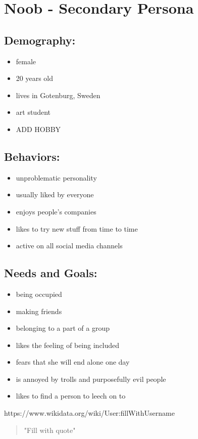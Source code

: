 \documentclass{article}
\date{02.12.2015}
\begin{document}
\section{Noob - Secondary Persona}

\subsection{Demography:}
\begin{itemize}
 \item female
 \item 20 years old
 \item lives in Gotenburg, Sweden
 \item art student
 \item ADD HOBBY
\end{itemize}

\subsection{Behaviors:}
\begin{itemize}
\item unproblematic personality
\item usually liked by everyone
\item enjoys people's companies
\item likes to try new stuff from time to time
\item active on all social media channels

\end{itemize}

\subsection{Needs and Goals:}
\begin{itemize}
 \item being occupied
 \item making friends
 \item belonging to a part of a group
 \item likes the feeling of being included
 \item fears that she will end alone one day
 \item is annoyed by trolls and purposefully evil people
 \item likes to find a person to leech on to
\end{itemize}

\pagebreak

https://www.wikidata.org/wiki/User:fillWithUsername
\begin{quote}
"Fill with quote"
\end{quote}
\end{document}

